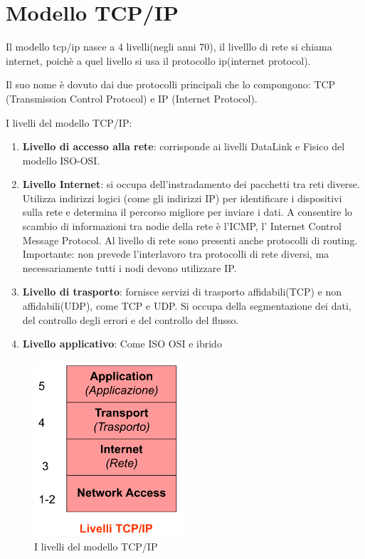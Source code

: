     \newpage
\section{Modello TCP/IP}
Il modello tcp/ip nasce a 4 livelli(negli anni 70), il livelllo di rete si chiama internet, poichè a quel livello si usa il protocollo ip(internet protocol).

Il suo nome è dovuto dai due protocolli principali che lo compongono: TCP (Transmission Control Protocol) e IP (Internet Protocol).

I livelli del modello TCP/IP:
\begin{enumerate}
    \item \textbf{Livello di accesso alla rete}: corrisponde ai livelli DataLink e Fisico del modello ISO-OSI.
    \item \textbf{Livello Internet}: si occupa dell'instradamento dei pacchetti tra reti diverse. Utilizza indirizzi logici (come gli indirizzi IP) per identificare i dispositivi sulla rete e determina il percorso migliore per inviare i dati.
    A consentire lo scambio di informazioni tra nodie della rete è l'ICMP, l' Internet Control Message Protocol. Al livello di rete sono presenti anche protocolli di routing. 
    Importante: non prevede l'interlavoro tra protocolli di rete
diversi, ma necessariamente tutti i nodi devono
utilizzare IP.
    \item \textbf{Livello di trasporto}: fornisce servizi di trasporto affidabili(TCP) e non affidabili(UDP), come TCP e UDP. Si occupa della segmentazione dei dati, del controllo degli errori e del controllo del flusso.
    \item \textbf{Livello applicativo}: Come ISO OSI e ibrido
\end{enumerate}

\begin{figure}[h!]
    \centering
    \includegraphics[width=0.5\textwidth]{images/modello_TCP_IP.png}
    \caption{I livelli del modello TCP/IP}
    \label{fig:tcp_ip_modello}
\end{figure}



